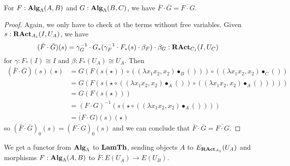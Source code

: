 \begin{lemma}
  For $ F : \mathbf{Alg}_{\Lambda}(A, B) $ and $ G: \mathbf{Alg}_{\Lambda}(B, C) $, we have $ \bar F \cdot \bar G = \overline{F \cdot G} $.
\end{lemma}
\begin{proof}
  Again, we only have to check at the terms without free variables. Given $ s : \mathbf{RAct}_{A_1}(I, U_A) $, we have
  \[ (\bar F \cdot \bar G)(s) = \gamma_G^{-1} \cdot G_*(\gamma_F^{-1} \cdot F_*(s) \cdot \beta_F) \cdot \beta_G: \mathbf{RAct}_{C_1}(I, U_C) \]
  for $ \gamma: F_*(I) \cong I $ and $ \beta: F_*(U_A) \cong U_A $. Then
  \begin{align*}
    (\bar F \cdot \bar G)(s)(\star)
    &= G(F(s(\star)) \circ ((\lambda x_1 x_2, x_2) \bullet_B ())) \circ ((\lambda x_1 x_2, x_2) \bullet_C ())\\
    &= G(F(s(\star \circ ((\lambda x_1 x_2, x_2) \bullet_A ()) \circ ((\lambda x_1 x_2, x_2) \bullet_A ()))))\\
    &= G(F(s(\star)))\\
    &= (F \cdot G)^{-1}(s(\star \circ ((\lambda x_1 x_2, x_2) \bullet_A ())))\\
    &= \overline(F \cdot G)(s)(\star)
  \end{align*}
  so $ (\bar F \cdot \bar G)_0(s) = (\overline{F \cdot G})_0(s) $ and we can conclude that $ \bar F \cdot \bar G = \overline{F \cdot G} $.
\end{proof}

\begin{definition}
  We get a functor from $ \mathbf{Alg}_{\Lambda} $ to $ \mathbf{LamTh} $, sending objects $ A $ to $ E_{\mathbf{RAct}_{A_1}}(U_A) $ and morphisms $ F: \mathbf{Alg}_{\Lambda}(A, B) $ to $ \bar F: E(U_A) \to E(U_B) $.
\end{definition}

